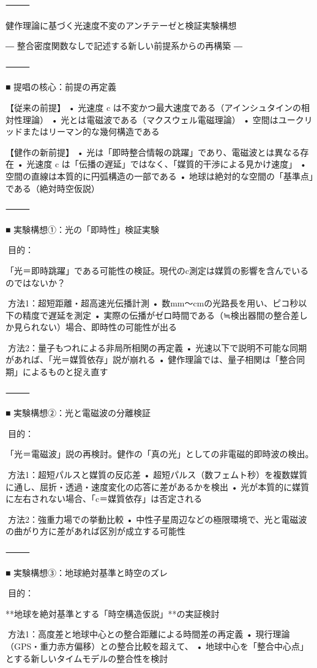 \documentclass{article}
\begin{document}
⸻

健作理論に基づく光速度不変のアンチテーゼと検証実験構想

― 整合密度関数なしで記述する新しい前提系からの再構築 ―

⸻

■ 提唱の核心：前提の再定義

【従来の前提】
	•	光速度 c は不変かつ最大速度である（アインシュタインの相対性理論）
	•	光とは電磁波である（マクスウェル電磁理論）
	•	空間はユークリッドまたはリーマン的な幾何構造である

【健作の新前提】
	•	光は「即時整合情報の跳躍」であり、電磁波とは異なる存在
	•	光速度 c は「伝播の遅延」ではなく、「媒質的干渉による見かけ速度」
	•	空間の直線は本質的に円弧構造の一部である
	•	地球は絶対的な空間の「基準点」である（絶対時空仮説）

⸻

■ 実験構想①：光の「即時性」検証実験

🔬目的：

「光＝即時跳躍」である可能性の検証。現代のc測定は媒質の影響を含んでいるのではないか？

🧪方法1：超短距離・超高速光伝播計測
	•	数mm〜cmの光路長を用い、ピコ秒以下の精度で遅延を測定
	•	実際の伝播がゼロ時間である（≒検出器間の整合差しか見られない）場合、即時性の可能性が出る

🧪方法2：量子もつれによる非局所相関の再定義
	•	光速以下で説明不可能な同期があれば、「光＝媒質依存」説が崩れる
	•	健作理論では、量子相関は「整合同期」によるものと捉え直す

⸻

■ 実験構想②：光と電磁波の分離検証

🔬目的：

「光＝電磁波」説の再検討。健作の「真の光」としての非電磁的即時波の検出。

🧪方法1：超短パルスと媒質の反応差
	•	超短パルス（数フェムト秒）を複数媒質に通し、屈折・透過・速度変化の応答に差があるかを検出
	•	光が本質的に媒質に左右されない場合、「c＝媒質依存」は否定される

🧪方法2：強重力場での挙動比較
	•	中性子星周辺などの極限環境で、光と電磁波の曲がり方に差があれば区別が成立する可能性

⸻

■ 実験構想③：地球絶対基準と時空のズレ

🔬目的：

**地球を絶対基準とする「時空構造仮説」**の実証検討

🧪方法1：高度差と地球中心との整合距離による時間差の再定義
	•	現行理論（GPS・重力赤方偏移）との整合比較を超えて、
	•	地球中心を「整合中心点」とする新しいタイムモデルの整合性を検討
\end{document}
